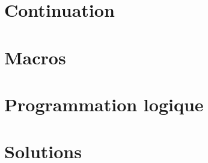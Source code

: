 \documentclass{scrreprt}
\begin{document}
\chapter{Continuation}


\chapter{Macros}














\chapter{Programmation logique}














\chapter{Solutions}
\shipoutAnswer
\end{document}
